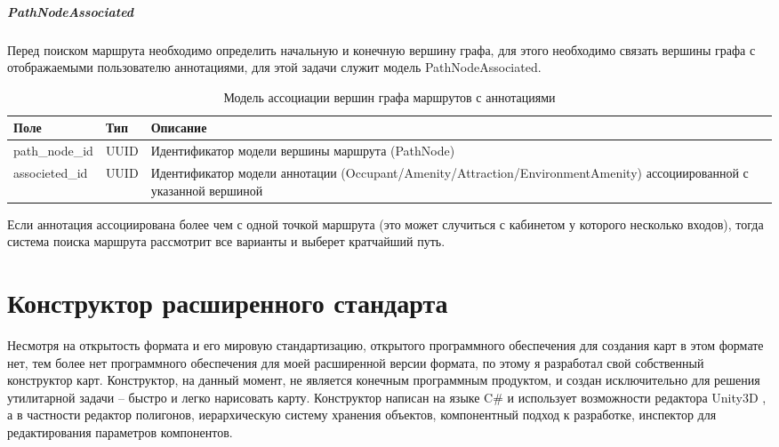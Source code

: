         \subparagraph{PathNodeAssociated}
          Перед поиском маршрута необходимо определить начальную и конечную вершину графа, для этого необходимо связать вершины графа с отображаемыми пользователю аннотациями, для этой задачи служит модель PathNodeAssociated.
          \begin{center}
            \begin{xltabular}{\linewidth}{|l|p{4cm}|X|}
              \caption{Модель ассоциации вершин графа маршрутов с аннотациями}\\\hline
              Поле            & Тип  & Описание                                                                                                             \\ \hline
              path\_node\_id  & UUID & Идентификатор модели вершины маршрута (PathNode)                                                                     \\ \hline
              associeted\_id  & UUID & Идентификатор модели аннотации (Occupant/Amenity/Attraction/EnvironmentAmenity) ассоциированной с указанной вершиной \\ \hline
            \end{xltabular}
          \end{center}


          Если аннотация ассоциирована более чем с одной точкой маршрута (это может случиться с кабинетом у которого несколько входов), тогда система поиска маршрута рассмотрит все варианты и выберет кратчайший путь.

  \section{Конструктор расширенного стандарта}
    Несмотря на открытость формата и его мировую стандартизацию, открытого программного обеспечения для создания карт в этом формате нет, тем более нет программного обеспечения для моей расширенной версии формата, по этому я разработал свой собственный конструктор карт. Конструктор, на данный момент, не является конечным программным продуктом, и создан исключительно для решения утилитарной задачи -- быстро и легко нарисовать карту. Конструктор написан на языке C\# и использует возможности редактора Unity3D \cite{Unity3D}, а в частности редактор полигонов, иерархическую систему хранения объектов, компонентный подход к разработке, инспектор для редактирования параметров компонентов.

